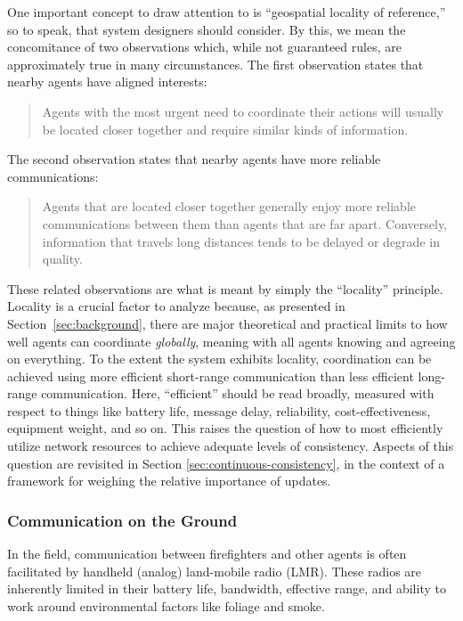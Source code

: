 \documentclass[]             %
{NASA}                       %
\theoremstyle{definition}
\begin{document}
One important concept to draw attention to is  ``geospatial
locality of reference,'' so to speak, that system designers should consider. By
this, we mean the concomitance of two observations which, while not
guaranteed rules, are approximately true in many circumstances. The
first observation states that nearby agents have aligned interests:
\begin{quote}
  Agents with the most urgent need to coordinate their
  actions will usually be located closer together and require similar
  kinds of information.
\end{quote}
The second observation states that nearby agents have more reliable
communications:
\begin{quote}
  Agents that are located closer together generally
  enjoy more reliable communications between them than agents that are
  far apart. Conversely, information that travels long distances tends to
  be delayed or degrade in quality.
\end{quote}

These related observations are what is meant by simply the
``locality'' principle. Locality is a crucial factor to analyze
because, as presented in Section~\ref{sec:background}, there are major
theoretical and practical limits to how well agents can coordinate
\emph{globally}, meaning with all agents knowing and agreeing on
everything. To the extent the system exhibits locality, coordination
can be achieved using more efficient short-range communication than
less efficient long-range communication. Here, ``efficient'' should be
read broadly, measured with respect to things like battery life,
message delay, reliability, cost-effectiveness, equipment weight, and
so on. This raises the question of how to most efficiently utilize
network resources to achieve adequate levels of consistency. Aspects
of this question are revisited in Section
\ref{sec:continuous-consistency}, in the context of a framework for
weighing the relative importance of updates.

\subsubsection{Communication on the Ground}
\label{sssec:ground-communication}
In the field, communication between firefighters and other agents is
often facilitated by handheld (analog) land-mobile radio (LMR). These
radios are inherently limited in their battery life, bandwidth,
effective range, and ability to work around environmental factors like
foliage and smoke.
\end{document}
